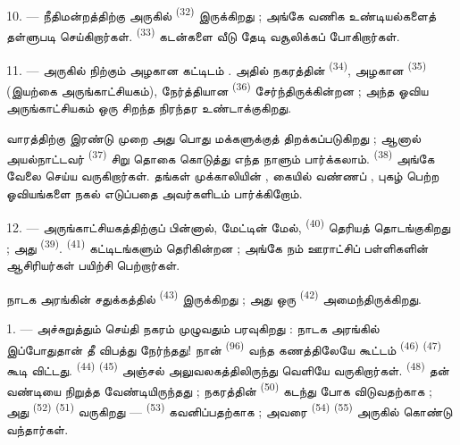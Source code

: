 10. --- நீதிமன்றத்திற்கு அருகில்  \textsuperscript{(32)}
இருக்கிறது ; அங்கே வணிக உண்டியல்களைத் தள்ளுபடி செய்கிறார்கள்.
 \textsuperscript{(33)} கடன்களை வீடு தேடி
வசூலிக்கப் போகிறார்கள்.

\VUsaut{4.0mm}
\VUsaut{3.4mm}

11. --- அருகில் நிற்கும் அழகான கட்டிடம் .
அதில் நகரத்தின்  \textsuperscript{(34)}, அழகான
 \textsuperscript{(35)}
(இயற்கை அருங்காட்சியகம்), நேர்த்தியான  \textsuperscript{(36)} சேர்ந்திருக்கின்றன ; அந்த
ஓவிய அருங்காட்சியகம் ஒரு சிறந்த நிரந்தர 
உண்டாக்குகிறது.

வாரத்திற்கு இரண்டு முறை அது பொது மக்களுக்குத் திறக்கப்படுகிறது ;
ஆனால் அயல்நாட்டவர்  \textsuperscript{(37)} சிறு
தொகை கொடுத்து எந்த நாளும் பார்க்கலாம். 
\textsuperscript{(38)} அங்கே வேலை செய்ய வருகிறார்கள். தங்கள்
முக்காலியின் , கையில் வண்ணப் ,
புகழ் பெற்ற ஓவியங்களை நகல் எடுப்பதை அவர்களிடம் பார்க்கிறோம்.

12. --- அருங்காட்சியகத்திற்குப் பின்னால், மேட்டின் மேல்,
 \textsuperscript{(40)} தெரியத் தொடங்குகிறது ; அது
 \textsuperscript{(39)}.  \textsuperscript{(41)} கட்டிடங்களும் தெரிகின்றன ;
அங்கே நம் ஊராட்சிப் பள்ளிகளின் ஆசிரியர்கள் பயிற்சி பெற்றார்கள்.

நாடக அரங்கின் சதுக்கத்தில் 
\textsuperscript{(43)} இருக்கிறது ; அது ஒரு 
\textsuperscript{(42)} அமைந்திருக்கிறது.

\VUsaut{5.0mm}
\VUsaut{3.0mm}

\VUsaut{3.4mm}

1. --- அச்சுறுத்தும் செய்தி நகரம் முழுவதும் பரவுகிறது : நாடக அரங்கில்
இப்போதுதான் தீ விபத்து நேர்ந்தது! நான் 
\textsuperscript{(96)} வந்த கணத்திலேயே கூட்டம் 
\textsuperscript{(46)}  \textsuperscript{(47)}
கூடி விட்டது.  \textsuperscript{(44)}
 \textsuperscript{(45)} அஞ்சல்
அலுவலகத்திலிருந்து வெளியே வருகிறார்கள்.  \textsuperscript{(48)} தன் வண்டியை நிறுத்த வேண்டியிருந்தது ;
நகரத்தின்  \textsuperscript{(50)} கடந்து போக
விடுவதற்காக ; அது  \textsuperscript{(52)}
 \textsuperscript{(51)} வருகிறது —
 \textsuperscript{(53)} கவனிப்பதற்காக ; அவரை
 \textsuperscript{(54)}  \textsuperscript{(55)} அருகில் கொண்டு வந்தார்கள்.

